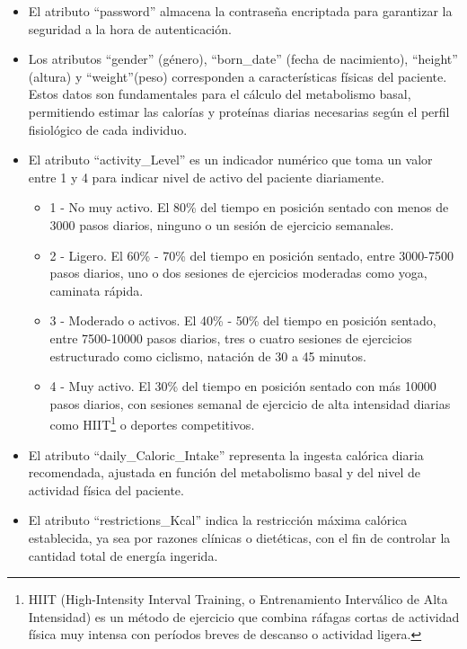 \begin{itemize}

\item El atributo ``password'' almacena la contraseña encriptada para garantizar la seguridad a la hora de autenticación.

\item Los atributos ``gender'' (género), ``born\_date'' (fecha de nacimiento), ``height'' (altura) y ``weight''(peso) corresponden a características físicas del paciente. Estos datos son fundamentales para el cálculo del metabolismo basal, permitiendo estimar las calorías y proteínas diarias necesarias según el perfil fisiológico de cada individuo.

\item El atributo ``activity\_Level'' es un indicador numérico que toma un valor entre 1 y 4 para indicar nivel de activo del paciente diariamente.

\begin{itemize}
    \item 1 - No muy activo. El 80\% del tiempo en posición sentado con menos de 3000 pasos diarios, ninguno o un sesión de ejercicio semanales. 
    \item 2 - Ligero. El 60\% - 70\% del tiempo en posición sentado, entre 3000-7500 pasos diarios, uno o dos sesiones de ejercicios moderadas como yoga, caminata rápida. 
    \item 3 - Moderado o activos. El 40\% - 50\% del tiempo en posición sentado, entre 7500-10000 pasos diarios, tres o cuatro sesiones de ejercicios estructurado como ciclismo, natación de 30 a 45 minutos. 
    \item 4 - Muy activo. El 30\% del tiempo en posición sentado con más 10000 pasos diarios, con sesiones semanal de ejercicio de alta intensidad diarias como HIIT\footnote{HIIT (High-Intensity Interval Training, o Entrenamiento Interválico de Alta Intensidad) es un método de ejercicio que combina ráfagas cortas de actividad física muy intensa con períodos breves de descanso o actividad ligera.}
    o deportes competitivos.
\end{itemize}

\item El atributo ``daily\_Caloric\_Intake'' representa la ingesta calórica diaria recomendada, ajustada en función del metabolismo basal y del nivel de actividad física del paciente.

\item El atributo ``restrictions\_Kcal'' indica la restricción máxima calórica establecida, ya sea por razones clínicas o dietéticas, con el fin de controlar la cantidad total de energía ingerida.


\end{itemize}
